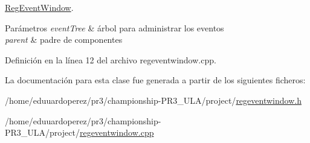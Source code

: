 \hyperlink{class_reg_event_window}{Reg\+Event\+Window}. 


\begin{DoxyParams}{Parámetros}
{\em event\+Tree} & árbol para administrar los eventos \\
\hline
{\em parent} & padre de componentes \\
\hline
\end{DoxyParams}


Definición en la línea 12 del archivo regeventwindow.\+cpp.



La documentación para esta clase fue generada a partir de los siguientes ficheros\+:\begin{DoxyCompactItemize}
\item 
/home/eduuardoperez/pr3/championship-\/\+P\+R3\+\_\+\+U\+L\+A/project/\hyperlink{regeventwindow_8h}{regeventwindow.\+h}\item 
/home/eduuardoperez/pr3/championship-\/\+P\+R3\+\_\+\+U\+L\+A/project/\hyperlink{regeventwindow_8cpp}{regeventwindow.\+cpp}\end{DoxyCompactItemize}
